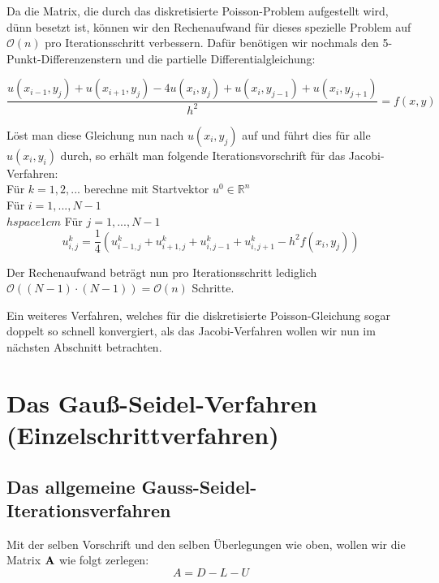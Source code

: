 Da die Matrix, die durch das diskretisierte Poisson-Problem aufgestellt wird, dünn besetzt ist, können wir den Rechenaufwand für dieses spezielle Problem auf $\mathcal{O}(n)$ pro Iterationsschritt verbessern. Dafür benötigen wir nochmals den 5-Punkt-Differenzenstern und die partielle Differentialgleichung:

\begin{equation}
\frac {u(x_{i-1},y_{j}) + u(x_{i+1},y_{j}) - 4u(x_{i},y_{j}) + u(x_{i},y_{j-1}) + u(x_{i},y_{j+1})} {h^{2}} = f(x,y)
\end{equation}

Löst man diese Gleichung nun nach $u(x_{i},y_{j})$ auf und führt dies für alle $u(x_{i},y_{i})$ durch, so erhält man folgende Iterationsvorschrift für das Jacobi-Verfahren: \\

Für $k = 1,2,...$ berechne mit Startvektor $u^{0} \in \mathbb{R}^{n}$ \\
Für $i = 1,...,N-1$ \\
$hspace{1cm}$ Für $j = 1,...,N-1$
\begin{equation}
u^{k}_{i,j} =   \frac {1} {4} (u^{k}_{i-1,j} + u^{k}_{i+1,j} + u^{k}_{i,j-1} + u^{k}_{i,j+1} - h^{2}f(x_{i},y_{j}))
\end{equation}

Der Rechenaufwand beträgt nun pro Iterationsschritt lediglich $\mathcal{O}((N-1) \cdot (N-1)) = \mathcal{O}(n)$ Schritte.

Ein weiteres Verfahren, welches für die diskretisierte Poisson-Gleichung sogar doppelt so schnell konvergiert, als das Jacobi-Verfahren wollen wir nun im nächsten Abschnitt betrachten.


\section{Das Gauß-Seidel-Verfahren (Einzelschrittverfahren)}\label{s.Das Gauss-Seidel-Verfahren}

\subsection{Das allgemeine Gauss-Seidel-Iterationsverfahren}\label{ss.Allgemeines Gauss-Seidel-Verfahren}

Mit der selben Vorschrift und den selben Überlegungen wie oben, wollen wir die Matrix ${\textbf{A}}$ wie folgt zerlegen:
\begin{equation}
A = D - L - U
\end{equation}

